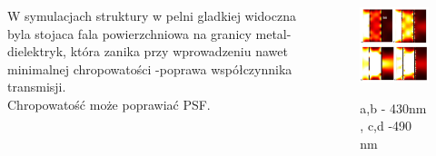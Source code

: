\documentclass{beamer}
\begin{document}
\begin{frame}
	\begin{columns}
		\begin{column}{0.5\textwidth}
				W symulacjach struktury w pelni gladkiej widoczna byla stojaca fala powierzchniowa na granicy metal-dielektryk, która zanika przy wprowadzeniu nawet minimalnej chropowatości -poprawa współczynnika transmisji.\\
				Chropowatość może poprawiać PSF.\\

		\end{column}
		\begin{column}{0.5\textwidth}
			\begin{figure}
				\includegraphics[width=\textwidth]{../images/multilayer/plp-chropo.png}\\
				\caption{ a,b - 430nm , c,d -490 nm}
			\end{figure}
		\end{column}
	\end{columns}
		
\end{frame}
\end{document}
